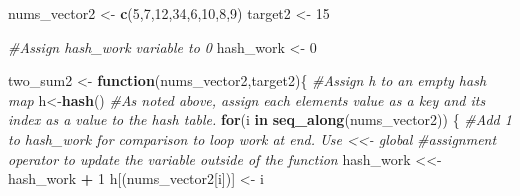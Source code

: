 \documentclass[
]{article}
\newenvironment{Shaded}{\begin{snugshade}}{\end{snugshade}}
\newcommand{\CommentTok}[1]{\textcolor[rgb]{0.56,0.35,0.01}{\textit{#1}}}
\newcommand{\ControlFlowTok}[1]{\textcolor[rgb]{0.13,0.29,0.53}{\textbf{#1}}}
\newcommand{\DecValTok}[1]{\textcolor[rgb]{0.00,0.00,0.81}{#1}}
\newcommand{\FunctionTok}[1]{\textcolor[rgb]{0.13,0.29,0.53}{\textbf{#1}}}
\newcommand{\NormalTok}[1]{#1}
\newcommand{\OtherTok}[1]{\textcolor[rgb]{0.56,0.35,0.01}{#1}}
\newcommand{\SpecialCharTok}[1]{\textcolor[rgb]{0.81,0.36,0.00}{\textbf{#1}}}
\begin{document}
\begin{Shaded}
\begin{Highlighting}[]
\NormalTok{nums\_vector2 }\OtherTok{\textless{}{-}} \FunctionTok{c}\NormalTok{(}\DecValTok{5}\NormalTok{,}\DecValTok{7}\NormalTok{,}\DecValTok{12}\NormalTok{,}\DecValTok{34}\NormalTok{,}\DecValTok{6}\NormalTok{,}\DecValTok{10}\NormalTok{,}\DecValTok{8}\NormalTok{,}\DecValTok{9}\NormalTok{)}
\NormalTok{target2 }\OtherTok{\textless{}{-}} \DecValTok{15}

\CommentTok{\#Assign hash\_work variable to 0}
\NormalTok{hash\_work }\OtherTok{\textless{}{-}} \DecValTok{0}


\NormalTok{two\_sum2 }\OtherTok{\textless{}{-}} \ControlFlowTok{function}\NormalTok{(nums\_vector2,target2)\{}
  \CommentTok{\#Assign h to an empty hash map}
\NormalTok{  h}\OtherTok{\textless{}{-}}\FunctionTok{hash}\NormalTok{()}
  \CommentTok{\#As noted above, assign each element\textquotesingle{}s value as a key and its index as a value to   the hash table.}
  \ControlFlowTok{for}\NormalTok{(i }\ControlFlowTok{in} \FunctionTok{seq\_along}\NormalTok{(nums\_vector2)) \{}
    \CommentTok{\#Add 1 to hash\_work for comparison to loop work at end. Use \textless{}\textless{}{-} global}
    \CommentTok{\#assignment operator to update the variable outside of the function}
\NormalTok{    hash\_work }\OtherTok{\textless{}\textless{}{-}}\NormalTok{ hash\_work }\SpecialCharTok{+} \DecValTok{1}
\NormalTok{    h[(nums\_vector2[i])] }\OtherTok{\textless{}{-}}\NormalTok{ i}


\end{Highlighting}
\end{Shaded}
\end{document}
